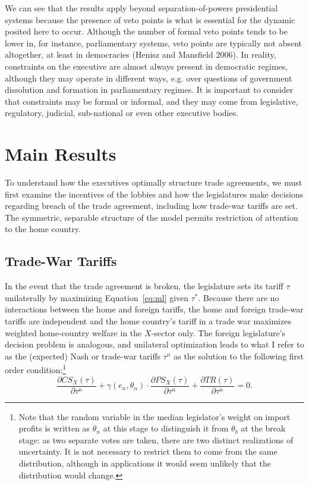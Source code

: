 \documentclass[10pt]{article}
\newcommand{\ve}{\theta}
\newcommand{\ta}{\theta}
\newcommand{\ga}{\gamma}
\begin{document}
We can see that the results apply beyond separation-of-powers presidential systems because the presence of veto points is what is essential for the dynamic posited here to occur. Although the number of formal veto points tends to be lower in, for instance, parliamentary systems, veto points are typically not absent altogether, at least in democracies (Henisz and Mansfield 2006). In reality, constraints on the executive are almost always present in democratic regimes, although they may operate in different ways, e.g. over questions of government dissolution and formation in parliamentary regimes. It is important to consider that constraints may be formal or informal, and they may come from legislative, regulatory, judicial, sub-national or even other executive bodies.




\section{Main Results}
\label{sec:main}
To understand how the executives optimally structure trade agreements, we must first examine the incentives of the lobbies and how the legislatures make decisions regarding breach of the trade agreement, including how trade-war tariffs are set. The symmetric, separable structure of the model permits restriction of attention to the home country.

\subsection{Trade-War Tariffs}
\label{sec:twt}
In the event that the trade agreement is broken, the legislature sets its tariff $\tau$ unilaterally by maximizing Equation~\ref{eq:ml} given $\tau^*$. Because there are no interactions between the home and foreign tariffs, the home and foreign trade-war tariffs are independent and the home country's tariff in a trade war maximizes weighted home-country welfare in the $X$-sector only. The foreign legislature's decision problem is analogous, and unilateral optimization leads to what I refer to as the (expected) Nash or trade-war tariffs $\tau^n$ as the solution to the following first order condition:\footnote{Note that the random variable in the median legislator's weight on import profits is written as $\ta_n$ at this stage to distinguish it from $\ta_b$ at the break stage: as two separate votes are taken, there are two distinct realizations of uncertainty. It is not necessary to restrict them to come from the same distribution, although in applications it would seem unlikely that the distribution would change.}
\begin{equation}
		\frac{\partial \mathit{CS}_X(\tau)}{\partial \tau^n} + \ga(e_n,\ve_n) \cdot \frac{\partial \mathit{PS}_X(\tau)}{\partial \tau^n} +  \frac{\partial \mathit{TR}(\tau)}{\partial \tau^n} = 0 .
		\label{eq:legfoc}
\end{equation}
\end{document}
